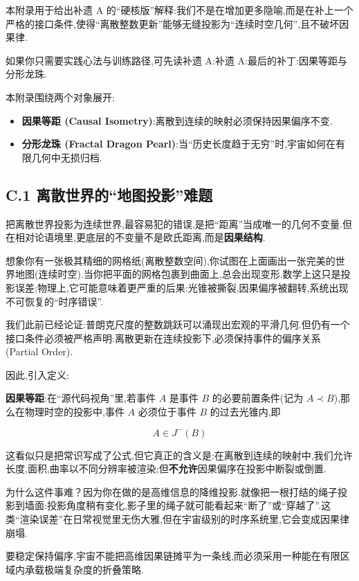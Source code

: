 本附录用于给出补遗 A 的``硬核版''解释:我们不是在增加更多隐喻,而是在补上一个严格的接口条件,使得``离散整数更新''能够无缝投影为``连续时空几何'',且不破坏因果律.

如果你只需要实践心法与训练路径,可先读补遗 A:补遗 A:最后的补丁:因果等距与分形龙珠.

本附录围绕两个对象展开:

\begin{itemize}
\item \textbf{因果等距 (Causal Isometry)}:离散到连续的映射必须保持因果偏序不变.
\item \textbf{分形龙珠 (Fractal Dragon Pearl)}:当``历史长度趋于无穷''时,宇宙如何在有限几何中无损归档.
\end{itemize}

\subsection*{C.1 离散世界的``地图投影''难题}

把离散世界投影为连续世界,最容易犯的错误,是把``距离''当成唯一的几何不变量.但在相对论语境里,更底层的不变量不是欧氏距离,而是\textbf{因果结构}.

想象你有一张极其精细的网格纸(离散整数空间),你试图在上面画出一张完美的世界地图(连续时空).当你把平面的网格包裹到曲面上,总会出现变形.数学上这只是投影误差;物理上,它可能意味着更严重的后果:光锥被撕裂,因果偏序被翻转,系统出现不可恢复的``时序错误''.

我们此前已经论证:普朗克尺度的整数跳跃可以涌现出宏观的平滑几何.但仍有一个接口条件必须被严格声明:离散更新在连续投影下,必须保持事件的偏序关系 (Partial Order).

因此,引入定义:

\textbf{因果等距}:在``源代码视角''里,若事件 $A$ 是事件 $B$ 的必要前置条件(记为 $A \prec B$),那么在物理时空的投影中,事件 $A$ 必须位于事件 $B$ 的过去光锥内,即

$$A \in J^{-}(B)$$

这看似只是把常识写成了公式,但它真正的含义是:在离散到连续的映射中,我们允许长度,面积,曲率以不同分辨率被渲染;但\textbf{不允许}因果偏序在投影中断裂或倒置.

为什么这件事难？因为你在做的是高维信息的降维投影.就像把一根打结的绳子投影到墙面:投影角度稍有变化,影子里的绳子就可能看起来``断了''或``穿越了''.这类``渲染误差''在日常视觉里无伤大雅,但在宇宙级别的时序系统里,它会变成因果律崩塌.

要稳定保持偏序,宇宙不能把高维因果链摊平为一条线,而必须采用一种能在有限区域内承载极端复杂度的折叠策略.

